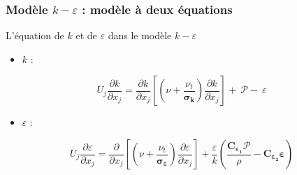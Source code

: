 \documentclass[12pt, xcolor=svgnames]{beamer}
\newcommand{\keps}{$k-\varepsilon$}
\newcommand{\warrow}{\item[\color{blue!50!black!70} \tiny{\ding{109}}]}
\newcommand{\sarrow}{\item[\color{blue!50!black!70!orange!60} \tiny{\ding{55}}]}
\newcommand{\bepar}[1]{
	\left( #1 \right)  
}
\newcommand{\becro}[1]{
	\left[ #1 \right]  
}
\newcommand{\moyu}[1]{
	\overline{U}_{#1}  
}
\begin{document}
%
%
%

\begin{frame}
\frametitle{Modèle \keps $ $ : modèle à deux équations}
\begin{block}{\color{gray!50!blue!10} L'équation de $k$ et de $\varepsilon$ dans le modèle \keps}
\begin{itemize}
\sarrow $k$ :
\end{itemize}
\begin{equation*} 
\moyu{j} \frac{\partial k}{\partial x_j} = \dfrac{\partial k}{\partial x_j} \becro{\bepar{\nu + \dfrac{\nu_t}{\boldsymbol{\sigma_k}}} \dfrac{\partial k}{\partial x_j}} + ~ \mathcal{P}-  ~\varepsilon
 \end{equation*}

\begin{itemize}
\sarrow $\varepsilon$ :
\end{itemize}
\begin{equation*}
\moyu{j} \dfrac{\partial \varepsilon}{\partial x_j} = \dfrac{\partial}{\partial x_j} \becro{\bepar{\nu + \dfrac{\nu_t}{\boldsymbol{\sigma_\varepsilon}}}\dfrac{\partial \varepsilon}{\partial x_j}} + \dfrac{\varepsilon}{k} \bepar{\dfrac{\boldsymbol{C_{\varepsilon_1}}\mathcal{P}}{\rho} - \boldsymbol{C_{\varepsilon_2}\varepsilon}}
\end{equation*}
\end{block}
\end{frame}
\end{document}
